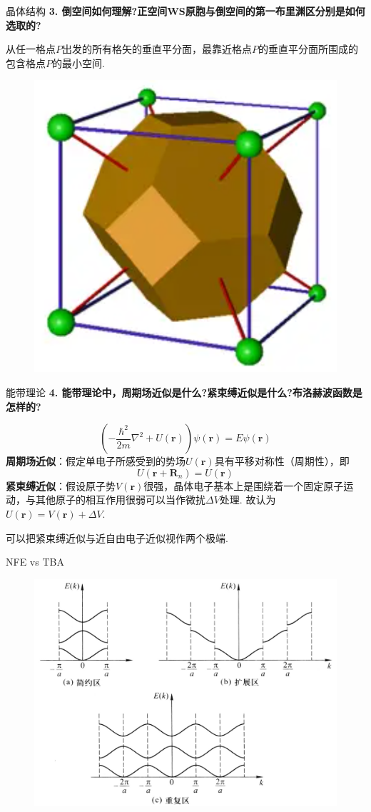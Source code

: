 \documentclass{beamer}
\begin{document}
\begin{frame}[t]{晶体结构}
    \textbf{3. 倒空间如何理解?正空间WS原胞与倒空间的第一布里渊区分别是如何选取的?}\par
    \vspace{0.1cm}
    从任一格点$P$出发的所有格矢的垂直平分面，最靠近格点$P$的垂直平分面所围成的包含格点$P$的最小空间.
    \begin{figure}[htbp]
        \includegraphics[width=0.3\linewidth]{1.png}
    \end{figure}
\end{frame}

\begin{frame}[t]{能带理论}
    \textbf{4. 能带理论中，周期场近似是什么?紧束缚近似是什么?布洛赫波函数是怎样的?}\par
    \vspace{-0.2cm}
    \[
    \left(-\frac{\hbar^2}{2m}\nabla^2+U(\boldsymbol{r})\right)\psi(\boldsymbol{r})=E\psi(\boldsymbol{r})
    \]
    \textbf{周期场近似}：假定单电子所感受到的势场$U(\boldsymbol{r})$具有平移对称性（周期性），即
    \[
    U(\boldsymbol{r}+\boldsymbol{R}_n)=U(\boldsymbol{r})
    \]
    \textbf{紧束缚近似}：假设原子势$V(\boldsymbol{r})$很强，晶体电子基本上是围绕着一个固定原子运动，与其他原子的相互作用很弱可以当作微扰$\Delta V$处理. \qquad 故认为$U(\boldsymbol{r}) = V(\boldsymbol{r}) + \Delta V$.\par
    \vspace{0.1cm}
    可以把紧束缚近似与近自由电子近似视作两个极端.

\end{frame}

\begin{frame}[t]{NFE vs TBA}
    \begin{figure}[htbp]
        \centering
        \includegraphics[width=0.75\linewidth]{2.png}
    \end{figure}
\end{frame}
\end{document}
